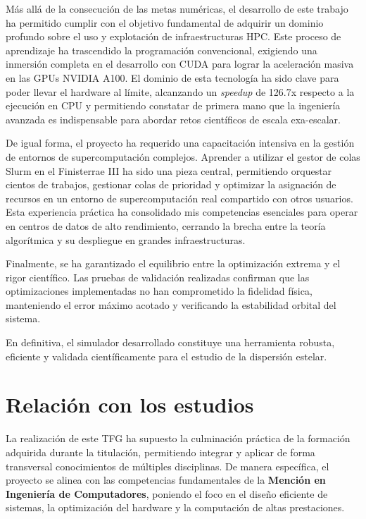 Más allá de la consecución de las metas numéricas, el desarrollo de este trabajo ha permitido cumplir con el objetivo fundamental de adquirir un dominio profundo sobre el uso y explotación de infraestructuras HPC.
Este proceso de aprendizaje ha trascendido la programación convencional, exigiendo una inmersión completa en el desarrollo con CUDA para lograr la aceleración masiva en las GPUs NVIDIA A100.
El dominio de esta tecnología ha sido clave para poder llevar el hardware al límite, alcanzando un \textit{speedup} de 126.7x respecto a la ejecución en CPU y permitiendo constatar de primera mano que la ingeniería avanzada es indispensable para abordar retos científicos de escala exa-escalar.

De igual forma, el proyecto ha requerido una capacitación intensiva en la gestión de entornos de supercomputación complejos.
Aprender a utilizar el gestor de colas Slurm en el Finisterrae III ha sido una pieza central, permitiendo orquestar cientos de trabajos, gestionar colas de prioridad y optimizar la asignación de recursos en un entorno de supercomputación real compartido con otros usuarios.
Esta experiencia práctica ha consolidado mis competencias esenciales para operar en centros de datos de alto rendimiento, cerrando la brecha entre la teoría algorítmica y su despliegue en grandes infraestructuras.

Finalmente, se ha garantizado el equilibrio entre la optimización extrema y el rigor científico.
Las pruebas de validación realizadas confirman que las optimizaciones implementadas no han comprometido la fidelidad física, manteniendo el error máximo acotado y verificando la estabilidad orbital del sistema.

En definitiva, el simulador desarrollado constituye una herramienta robusta, eficiente y validada científicamente para el estudio de la dispersión estelar.

\section{Relación con los estudios}\label{sec:relacion-con-los-estudios}

La realización de este TFG ha supuesto la culminación práctica de la formación adquirida durante la titulación, permitiendo integrar y aplicar de forma transversal conocimientos de múltiples disciplinas.
De manera específica, el proyecto se alinea con las competencias fundamentales de la \textbf{Mención en Ingeniería de Computadores}, poniendo el foco en el diseño eficiente de sistemas, la optimización del hardware y la computación de altas prestaciones.

